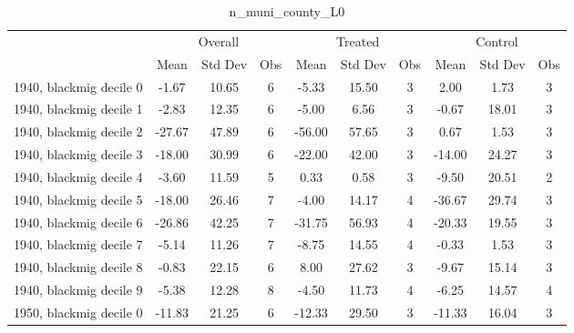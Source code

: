 \begin{table}[htbp]\centering
\def\sym#1{\ifmmode^{#1}\else\(^{#1}\)\fi}
\caption{n\_muni\_county\_L0 \label{tab1}}
\begin{tabular}{l*{3}{ccc}}
\toprule
                    &\multicolumn{3}{c}{Overall}           &\multicolumn{3}{c}{Treated}           &\multicolumn{3}{c}{Control}           \\
                    &        Mean&     Std Dev&         Obs&        Mean&     Std Dev&         Obs&        Mean&     Std Dev&         Obs\\
\midrule
1940, blackmig decile 0&       -1.67&       10.65&           6&       -5.33&       15.50&           3&        2.00&        1.73&           3\\
1940, blackmig decile 1&       -2.83&       12.35&           6&       -5.00&        6.56&           3&       -0.67&       18.01&           3\\
1940, blackmig decile 2&      -27.67&       47.89&           6&      -56.00&       57.65&           3&        0.67&        1.53&           3\\
1940, blackmig decile 3&      -18.00&       30.99&           6&      -22.00&       42.00&           3&      -14.00&       24.27&           3\\
1940, blackmig decile 4&       -3.60&       11.59&           5&        0.33&        0.58&           3&       -9.50&       20.51&           2\\
1940, blackmig decile 5&      -18.00&       26.46&           7&       -4.00&       14.17&           4&      -36.67&       29.74&           3\\
1940, blackmig decile 6&      -26.86&       42.25&           7&      -31.75&       56.93&           4&      -20.33&       19.55&           3\\
1940, blackmig decile 7&       -5.14&       11.26&           7&       -8.75&       14.55&           4&       -0.33&        1.53&           3\\
1940, blackmig decile 8&       -0.83&       22.15&           6&        8.00&       27.62&           3&       -9.67&       15.14&           3\\
1940, blackmig decile 9&       -5.38&       12.28&           8&       -4.50&       11.73&           4&       -6.25&       14.57&           4\\
1950, blackmig decile 0&      -11.83&       21.25&           6&      -12.33&       29.50&           3&      -11.33&       16.04&           3\\

\end{tabular}
\end{table}
